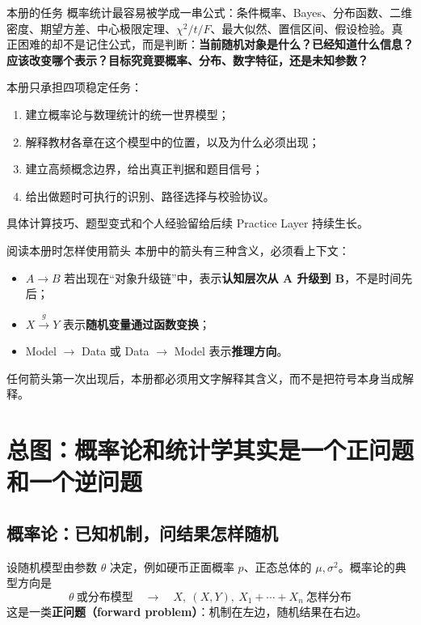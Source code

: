 \documentclass[11pt,a4paper,openany]{ctexbook}
\newcommand{\key}[1]{\textbf{\color{deep}#1}}
\begin{document}
\begin{corebox}{本册的任务}
概率统计最容易被学成一串公式：条件概率、Bayes、分布函数、二维密度、期望方差、中心极限定理、$\chi^2/t/F$、最大似然、置信区间、假设检验。真正困难的却不是记住公式，而是判断：\key{当前随机对象是什么？已经知道什么信息？应该改变哪个表示？目标究竟要概率、分布、数字特征，还是未知参数？}

本册只承担四项稳定任务：
\begin{enumerate}
  \item 建立概率论与数理统计的统一世界模型；
  \item 解释教材各章在这个模型中的位置，以及为什么必须出现；
  \item 建立高频概念边界，给出真正判据和题目信号；
  \item 给出做题时可执行的识别、路径选择与校验协议。
\end{enumerate}
具体计算技巧、题型变式和个人经验留给后续 Practice Layer 持续生长。
\end{corebox}

\begin{methodbox}{阅读本册时怎样使用箭头}
本册中的箭头有三种含义，必须看上下文：
\begin{itemize}
  \item $A\to B$ 若出现在“对象升级链”中，表示\key{认知层次从 A 升级到 B}，不是时间先后；
  \item $X\xrightarrow{g}Y$ 表示\key{随机变量通过函数变换}；
  \item Model $\to$ Data 或 Data $\to$ Model 表示\key{推理方向}。
\end{itemize}
任何箭头第一次出现后，本册都必须用文字解释其含义，而不是把符号本身当成解释。
\end{methodbox}

\tableofcontents
\mainmatter

\chapter{总图：概率论和统计学其实是一个正问题和一个逆问题}

\section{概率论：已知机制，问结果怎样随机}
设随机模型由参数 $\theta$ 决定，例如硬币正面概率 $p$、正态总体的 $\mu,\sigma^2$。概率论的典型方向是
\[
\boxed{\theta\ \text{或分布模型}\quad\longrightarrow\quad X,\ (X,Y),\ X_1+\cdots+X_n\ \text{怎样分布}}
\]
这是一类\key{正问题（forward problem）}：机制在左边，随机结果在右边。
\end{document}
